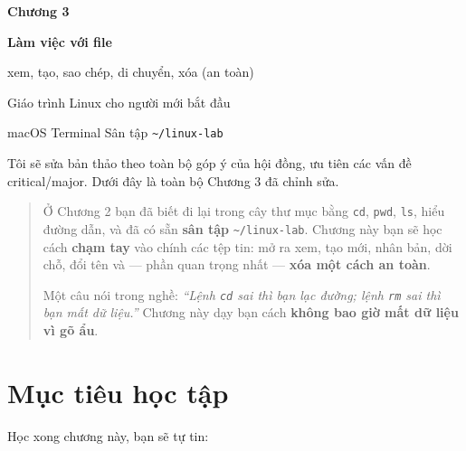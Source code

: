 \documentclass[12pt,a4paper]{article}
\newcommand{\cmd}[1]{\texttt{#1}}
\begin{document}
\begin{titlepage}
\centering
\vspace*{3cm}
{\Huge\bfseries\color{seniorblue} Chương 3\par}
\vspace{1cm}
{\LARGE\bfseries Làm việc với file\par}
\vspace{0.5cm}
{\large xem, tạo, sao chép, di chuyển, xóa (an toàn)\par}
\vspace{2cm}
{\large Giáo trình Linux cho người mới bắt đầu\par}
\vfill
{\large macOS \textbullet{} Terminal \textbullet{} Sân tập \cmd{\textasciitilde/linux-lab}\par}
\vspace{1cm}
\end{titlepage}

\tableofcontents
\newpage

\noindent
Tôi sẽ sửa bản thảo theo toàn bộ góp ý của hội đồng, ưu tiên các vấn đề critical/major. Dưới đây là toàn bộ Chương 3 đã chỉnh sửa.

\vspace{1em}

\begin{quote}
Ở Chương 2 bạn đã biết đi lại trong cây thư mục bằng \cmd{cd}, \cmd{pwd}, \cmd{ls}, hiểu đường dẫn, và đã có sẵn \textbf{sân tập} \cmd{\textasciitilde/linux-lab}. Chương này bạn sẽ học cách \textbf{chạm tay} vào chính các tệp tin: mở ra xem, tạo mới, nhân bản, dời chỗ, đổi tên và --- phần quan trọng nhất --- \textbf{xóa một cách an toàn}.

\vspace{0.5em}
Một câu nói trong nghề: \textit{``Lệnh \cmd{cd} sai thì bạn lạc đường; lệnh \cmd{rm} sai thì bạn mất dữ liệu.''} Chương này dạy bạn cách \textbf{không bao giờ mất dữ liệu vì gõ ẩu}.
\end{quote}

\section*{Mục tiêu học tập}

Học xong chương này, bạn sẽ tự tin:
\end{document}
